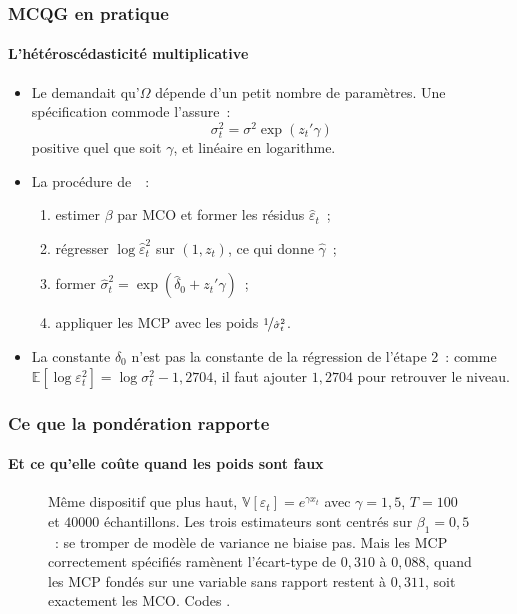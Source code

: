 \documentclass[10pt]{beamer}
\begin{document}
\begin{frame}
  \frametitle{MCQG en pratique}
  \framesubtitle{L'hétéroscédasticité multiplicative}

  \begin{itemize}

  \item Le  demandait qu'$\Omega$ dépende d'un petit nombre de
    paramètres. Une spécification commode l'assure~:
    \[
      \sigma_t^2 = \sigma^2\exp\left(z_t'\gamma\right)
    \]
    positive quel que soit $\gamma$, et linéaire en logarithme.\newline

  \item[$\Rightarrow$] La procédure de~\cite{Harvey1976}~:
    \begin{enumerate}
    \item estimer $\beta$ par MCO et former les résidus $\hat\varepsilon_t$~;
    \item régresser $\log\hat\varepsilon_t^2$ sur $(1, z_t)$, ce qui donne
      $\hat\gamma$~;
    \item former $\hat\sigma_t^2 = \exp(\hat\delta_0 + z_t'\hat\gamma)$~;
    \item appliquer les MCP avec les poids $\nicefrac{1}{\hat\sigma_t^2}$.
    \end{enumerate}

  \item La constante $\hat\delta_0$ n'est pas la constante de la régression de
    l'étape 2~: comme $\mathbb E[\log\varepsilon_t^2] = \log\sigma_t^2 -
    1{,}2704$, il faut ajouter $1{,}2704$ pour retrouver le niveau.\newline

  \end{itemize}


\end{frame}


\begin{frame}[c]
  \frametitle{Ce que la pondération rapporte}
  \framesubtitle{Et ce qu'elle coûte quand les poids sont faux}

  \begin{figure}
    \centering
    \scalebox{.42}{}
    \caption{Même dispositif que plus haut,
      $\mathbb V[\varepsilon_t]=e^{\gamma x_t}$ avec $\gamma=1{,}5$, $T=100$ et
      $40000$ échantillons. Les trois estimateurs sont centrés sur $\beta_1=0{,}5$~:
      se tromper de modèle de variance ne biaise pas. Mais les MCP correctement
      spécifiés ramènent l'écart-type de $0{,}310$ à $0{,}088$, quand les MCP
      fondés sur une variable sans rapport restent à $0{,}311$, soit exactement
      les MCO\@. Codes .}
  \end{figure}

\end{frame}
\end{document}

